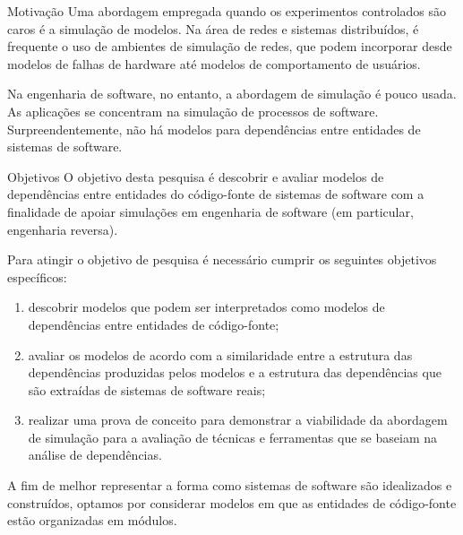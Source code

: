 \begin{section}{Motivação}
	Uma abordagem empregada quando os experimentos controlados são caros é a simulação de modelos. Na área de redes e sistemas distribuídos, é frequente o uso de ambientes de simulação de redes, que podem incorporar desde modelos de falhas de hardware até modelos de comportamento de usuários. %

	Na engenharia de software, no entanto, a abordagem de simulação é pouco usada. As aplicações se concentram na simulação de processos de software. Surpreendentemente, não há modelos para dependências entre entidades de sistemas de software.	
\end{section}

\begin{section}{Objetivos}
	O objetivo desta pesquisa é descobrir e avaliar modelos de dependências entre entidades do código-fonte de sistemas de software com a finalidade de apoiar simulações em engenharia de software (em particular, engenharia reversa).
	
	Para atingir o objetivo de pesquisa é necessário cumprir os seguintes objetivos específicos:
	
	\begin{enumerate}
		\item descobrir modelos que podem ser interpretados como modelos de dependências entre entidades de código-fonte;
		\item avaliar os modelos de acordo com a similaridade entre a estrutura das dependências produzidas pelos modelos e a estrutura das dependências que são extraídas de sistemas de software reais;
		\item realizar uma prova de conceito para demonstrar a viabilidade da abordagem de simulação para a avaliação de técnicas e ferramentas que se baseiam na análise de dependências.
	\end{enumerate}
	
	A fim de melhor representar a forma como sistemas de software são idealizados e construídos, optamos por considerar modelos em que as entidades de código-fonte estão organizadas em módulos. %
	
\end{section}

